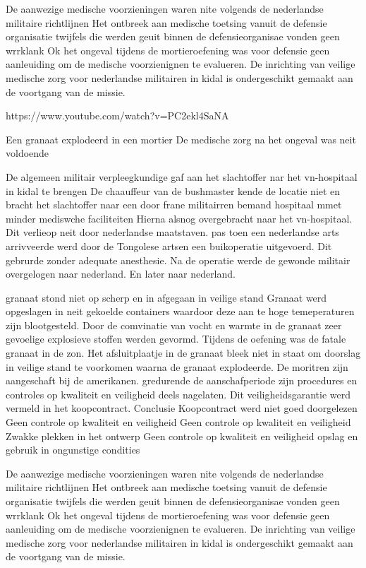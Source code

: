 De aanwezige medische voorzieningen waren nite volgends de nederlandse militaire richtlijnen
Het ontbreek aan medische toetsing vanuit de defensie organisatie
twijfels die werden geuit binnen de defensieorganisae vonden geen wrrklank
Ok het ongeval tijdens de mortieroefening was voor defensie geen aanleuiding om de medische voorzienignen te evalueren.
De inrichting van veilige medische zorg voor nederlandse militairen in kidal is ondergeschikt gemaakt aan de voortgang van de missie.


https://www.youtube.com/watch?v=PC2ekl4SaNA 


Een granaat explodeerd in een mortier
De medische zorg na het ongeval was neit voldoende


De algemeen militair verpleegkundige gaf aan het slachtoffer nar het vn-hospitaal in kidal te brengen
De chaauffeur van de bushmaster kende de locatie niet  en bracht het slachtoffer naar een door frane militairren bemand hospitaal mmet minder mediswche faciliteiten
Hierna alsnog overgebracht naar het vn-hospitaal.
Dit verlieop  neit door nederlandse maatstaven.
pas toen een nederlandse arts arrivveerde werd door de Tongolese artsen een buikoperatie uitgevoerd.
Dit gebrurde zonder adequate anesthesie.
Na de operatie werde de gewonde militair overgelogen naar nederland. En later naar nederland.


granaat stond niet op scherp en in afgegaan in veilige stand
Granaat werd opgeslagen in neit gekoelde containers waardoor deze aan te hoge temeperaturen zijn blootgesteld.
Door de comvinatie van vocht en warmte in de granaat zeer gevoelige explosieve stoffen werden gevormd.
Tijdens de oefening was de fatale granaat in de zon.
Het afsluitplaatje in de granaat bleek niet in staat om doorslag in veilige stand te voorkomen waarna de granaat explodeerde.
De moritren zijn aangeschaft bij de amerikanen. gredurende de aanschafperiode zijn procedures en controles op kwaliteit en veiligheid deels nagelaten.
Dit veiligheidsgarantie werd vermeld in het koopcontract.
Conclusie
Koopcontract werd niet goed doorgelezen
Geen controle op kwaliteit en veiligheid
Geen controle op kwaliteit en veiligheid
Zwakke plekken in het ontwerp
Geen controle op kwaliteit en veiligheid
opslag en gebruik in ongunstige condities

De aanwezige medische voorzieningen waren nite volgends de nederlandse militaire richtlijnen
Het ontbreek aan medische toetsing vanuit de defensie organisatie
twijfels die werden geuit binnen de defensieorganisae vonden geen wrrklank
Ok het ongeval tijdens de mortieroefening was voor defensie geen aanleuiding om de medische voorzienignen te evalueren.
De inrichting van veilige medische zorg voor nederlandse militairen in kidal is ondergeschikt gemaakt aan de voortgang van de missie.


